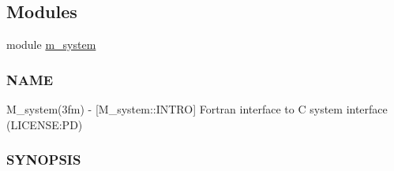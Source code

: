 \subsection*{Modules}
\begin{DoxyCompactItemize}
\item 
module \mbox{\hyperlink{namespacem__system}{m\+\_\+system}}
\begin{DoxyCompactList}\small\item\em \subsubsection*{N\+A\+ME}

M\+\_\+system(3fm) -\/ \mbox{[}M\+\_\+system\+::\+I\+N\+T\+RO\mbox{]} Fortran interface to C system interface (L\+I\+C\+E\+N\+SE\+:PD) \subsubsection*{S\+Y\+N\+O\+P\+S\+IS}\end{DoxyCompactList}\end{DoxyCompactItemize}
